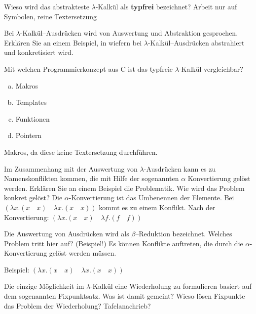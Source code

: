 \begin{card}
	Wieso wird das abstrakteste $\lambda$-Kalkül als \textbf{typfrei} bezeichnet?
	\hr
	Arbeit nur auf Symbolen, reine Textersetzung
\end{card}

\begin{card}
	Bei $\lambda$-Kalkül–Ausdrücken wird von Auswertung und Abstraktion gesprochen. Erklären Sie an einem Beispiel, in wiefern bei $\lambda$-Kalkül–Ausdrücken abstrahiert und	konkretisiert wird.
	\hr
\end{card}

\begin{card}
	Mit welchen Programmierkonzept aus C ist das typfreie $\lambda$-Kalkül vergleichbar? 
	\begin{enumerate}[a)]
	\item Makros
	\item Templates
	\item Funktionen
	\item Pointern
	\end{enumerate}
	\hr
	Makros, da diese keine Textersetzung durchführen.
\end{card}

\begin{card}
	Im Zusammenhang mit der Auswertung von $\lambda$-Ausdrücken kann es zu Namenskonflikten	kommen, die mit Hilfe der sogenannten
	$\alpha$
	Konvertierung gelöst werden. Erklären Sie an einem Beispiel die Problematik. Wie wird das Problem konkret gelöst?
	\hr
  Die $\alpha$-Konvertierung ist das Umbenennen der Elemente. Bei $(\lambda x.(x \quad x) \quad \lambda x.(x \quad x))$ kommt es zu einem Konflikt. Nach
  der Konvertierung: $(\lambda x.(x \quad x) \quad \lambda f.(f \quad f))$
\end{card}

\begin{card}
	Die Auswertung von Ausdrücken wird als $\beta$–Reduktion bezeichnet. Welches Problem tritt hier auf? (Beispiel!)
	\hr
	Es können Konflikte auftreten, die durch die $\alpha$-Konvertierung gelöst werden müssen.

	Beispiel: $(\lambda x.(x \quad x) \quad \lambda x.(x \quad x))$
\end{card}

\begin{card}
	Die einzige Möglichkeit im $\lambda$-Kalkül eine Wiederholung zu formulieren basiert auf dem sogenannten Fixpunktsatz. Was ist damit gemeint? Wieso lösen Fixpunkte das Problem der Wiederholung? 
	\hr
	Tafelanachrieb?
\end{card}
